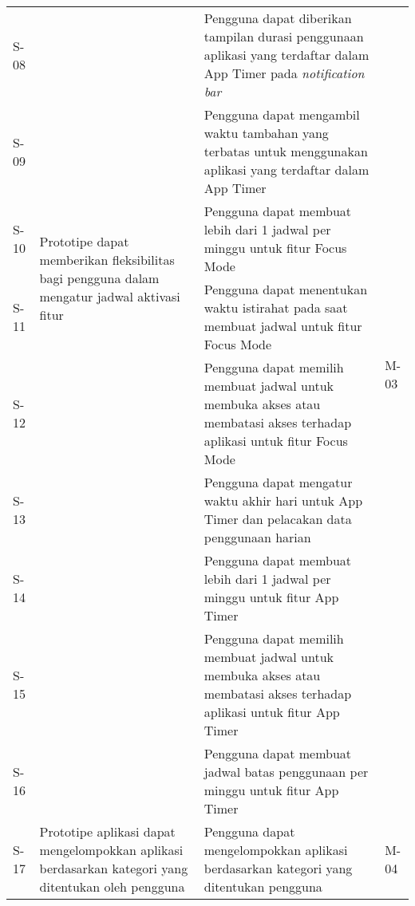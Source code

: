 \begin{longtable}[c]{|p{}|p{}|p{}|p{}|}
  S-08 &  
  & Pengguna dapat diberikan tampilan durasi penggunaan aplikasi yang terdaftar dalam App Timer pada \textit{notification bar}
  & \\ \cline{1-1} \cline{3-3}
  
  S-09 &  
  & Pengguna dapat mengambil waktu tambahan yang terbatas untuk menggunakan aplikasi yang terdaftar dalam App Timer
  
  & \\ \hline
  S-10
  & \multirow{2}{0.3\textwidth}{Prototipe dapat memberikan fleksibilitas bagi
  pengguna dalam mengatur jadwal aktivasi fitur}
  & Pengguna dapat membuat lebih dari 1 jadwal per minggu untuk fitur Focus Mode
  & \multirow{4}{0.1\textwidth}{M-03} \\ \cline{1-1} \cline{3-3}
  
  S-11 &  
  & Pengguna dapat menentukan waktu istirahat pada saat membuat jadwal untuk fitur Focus Mode
  & \\ \cline{1-1} \cline{3-3}
  
  S-12 &  
  & Pengguna dapat memilih membuat jadwal untuk membuka akses atau membatasi akses terhadap aplikasi untuk fitur Focus Mode   
  & \\ \cline{1-1} \cline{3-3}
  
  S-13 &  
  & Pengguna dapat mengatur waktu akhir hari untuk App Timer dan pelacakan data penggunaan harian  
  & \\ \cline{1-1} \cline{3-3}
  
  S-14 &  
  & Pengguna dapat membuat lebih dari 1 jadwal per minggu untuk fitur App Timer   
  & \\ \cline{1-1} \cline{3-3}
  
  S-15 &  
  & Pengguna dapat memilih membuat jadwal untuk membuka akses atau membatasi akses terhadap aplikasi untuk fitur App Timer   
  & \\ \cline{1-1} \cline{3-3}
  
  S-16 &  
  & Pengguna dapat membuat jadwal batas penggunaan per minggu untuk fitur App Timer   

  & \\ \hline
  S-17
  & Prototipe aplikasi dapat mengelompokkan aplikasi berdasarkan kategori yang ditentukan oleh pengguna
  & Pengguna dapat mengelompokkan aplikasi berdasarkan kategori yang ditentukan pengguna
  & M-04 \\ \hline
  

\end{longtable}
